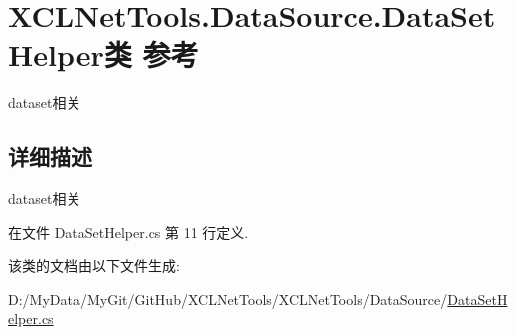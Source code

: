 \hypertarget{class_x_c_l_net_tools_1_1_data_source_1_1_data_set_helper}{\section{X\-C\-L\-Net\-Tools.\-Data\-Source.\-Data\-Set\-Helper类 参考}
\label{class_x_c_l_net_tools_1_1_data_source_1_1_data_set_helper}
}


dataset相关  




\subsection{详细描述}
dataset相关 



在文件 Data\-Set\-Helper.\-cs 第 11 行定义.



该类的文档由以下文件生成\-:\begin{DoxyCompactItemize}
\item 
D\-:/\-My\-Data/\-My\-Git/\-Git\-Hub/\-X\-C\-L\-Net\-Tools/\-X\-C\-L\-Net\-Tools/\-Data\-Source/\hyperlink{_data_set_helper_8cs}{Data\-Set\-Helper.\-cs}\end{DoxyCompactItemize}
